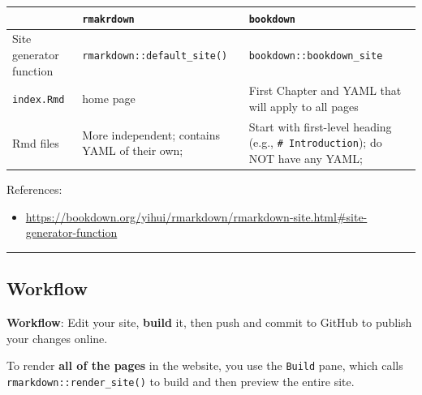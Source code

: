 \documentclass[
  a4paper,
  twoside,
  openright]{book}
\providecommand{\tightlist}{%
  \setlength{\itemsep}{0pt}\setlength{\parskip}{0pt}}
\theoremstyle{definition}
\theoremstyle{definition}
\theoremstyle{definition}
\theoremstyle{definition}
\theoremstyle{remark}
\begin{document}
\begin{longtable}[]{@{}
  >{\raggedright\arraybackslash}p{}
  >{\raggedright\arraybackslash}p{}
  >{\raggedright\arraybackslash}p{}@{}}
\toprule\noalign{}
\begin{minipage}[b]{\linewidth}\raggedright
\end{minipage} & \begin{minipage}[b]{\linewidth}\raggedright
\texttt{rmakrdown}
\end{minipage} & \begin{minipage}[b]{\linewidth}\raggedright
\texttt{bookdown}
\end{minipage} \\
\midrule\noalign{}
\endhead
\bottomrule\noalign{}
\endlastfoot
Site generator function & \texttt{rmarkdown::default\_site()} & \texttt{bookdown::bookdown\_site} \\
\texttt{index.Rmd} & home page & First Chapter and YAML that will apply to all pages \\
Rmd files & More independent; contains YAML of their own; & Start with first-level heading (e.g., \texttt{\#\ Introduction}); do NOT have any YAML; \\
\end{longtable}

References:

\begin{itemize}
\tightlist
\item
  \url{https://bookdown.org/yihui/rmarkdown/rmarkdown-site.html\#site-generator-function}
\end{itemize}

\begin{center}\rule{0.5\linewidth}{0.5pt}\end{center}

\subsection*{Workflow}\label{workflow}

{\textbf{Workflow}}: Edit your site, \textbf{build} it, then push and commit to GitHub to publish your changes online.

To render {\textbf{all of the pages}} in the website, you use the \texttt{Build} pane, which calls \texttt{rmarkdown::render\_site()} to build and then preview the entire site.
\end{document}

